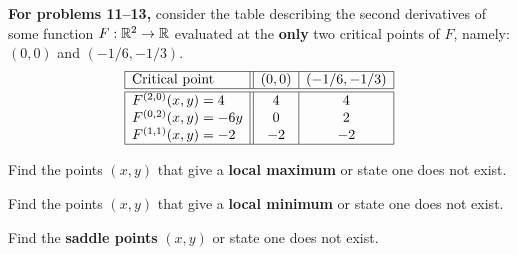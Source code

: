 \documentclass{ximera}
\author{Bart Snapp}
\begin{document}
\textbf{For problems 11--13,} consider the table describing the second
derivatives of some function $F:\mathbb R^2\to\mathbb R$ evaluated at the
\textbf{only} two critical points of $F$, namely: $(0,0)$ and
$(-1/6,-1/3)$.
\[
\begin{array}{|l||c|c|}\hline
  \text{Critical point} & (0,0) & (-1/6,-1/3)\\\hline\hline
  F^{(2,0)}(x,y) = 4      & 4     &  4 \\
  F^{(0,2)}(x,y) =-6y     & 0     &  2 \\
  F^{(1,1)}(x,y) =-2      & -2    & -2 \\
  \hline
\end{array}
\]
\begin{problem}
Find the points $(x,y)$ that give a \textbf{local maximum} or state one
does not exist.
\begin{prompt}
  \begin{selectAll}
  \end{selectAll}
\end{prompt}
\vfill
\end{problem}
\begin{problem}
  Find the points $(x,y)$ that give a \textbf{local minimum} or state one
  does not exist.
  \begin{prompt}
  \begin{selectAll}
  \end{selectAll}
  \end{prompt}
  \vfill
\end{problem}
\begin{problem}
  Find the \textbf{saddle points} $(x,y)$ or state one does not exist.
  \begin{prompt}
  \begin{selectAll}
  \end{selectAll}
\end{prompt}
  \vfill
\end{problem}
\end{document}
